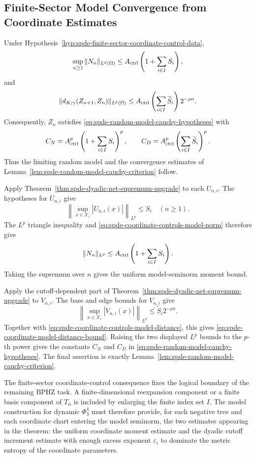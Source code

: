 \subsection{Finite-Sector Model Convergence from Coordinate Estimates}
\label{thm:spde-coordinate-estimates-model-convergence}
Under Hypothesis~\ref{hyp:spde-finite-sector-coordinate-control-data},
\[
  \sup_{n\geq1}
  \|N_n\|_{L^p(\Omega)}
  \leq
  A_{\rm ctrl}\left(1+\sum_{i\in I}S_i\right),
\]
and
\begin{equation}
  \|d_{K;\gamma}(Z_{n+1},Z_n)\|_{L^p(\Omega)}
  \leq
  A_{\rm ctrl}
  \left(\sum_{i\in I}\widetilde S_i\right)2^{-\rho n}.
  \label{eq:spde-coordinate-model-distance-bound}
\end{equation}
Consequently, \(Z_n\) satisfies
\eqref{eq:spde-random-model-cauchy-hypotheses} with
\[
  C_N=
  A_{\rm ctrl}^p\left(1+\sum_{i\in I}S_i\right)^p,
  \qquad
  C_D=
  A_{\rm ctrl}^p\left(\sum_{i\in I}\widetilde S_i\right)^p .
\]
Thus the limiting random model and the convergence estimates of
Lemma~\ref{lem:spde-random-model-cauchy-criterion} follow.

Apply Theorem~\ref{thm:spde-dyadic-net-supremum-upgrade} to each
\(U_{n,i}\).  The hypotheses for \(U_{n,i}\) give
\[
  \left\|
    \sup_{x\in\mathcal X_i}|U_{n,i}(x)|
  \right\|_{L^p}
  \leq S_i
  \quad(n\geq1).
\]
The \(L^p\) triangle inequality and
\eqref{eq:spde-coordinate-controls-model-norm} therefore give
\[
  \|N_n\|_{L^p}
  \leq
  A_{\rm ctrl}
  \left(1+\sum_{i\in I}S_i\right).
\]
Taking the supremum over \(n\) gives the uniform model-seminorm moment
bound.

Apply the cutoff-dependent part of
Theorem~\ref{thm:spde-dyadic-net-supremum-upgrade} to \(V_{n,i}\).  The
base and edge bounds for \(V_{n,i}\) give
\[
  \left\|
    \sup_{x\in\mathcal X_i}|V_{n,i}(x)|
  \right\|_{L^p}
  \leq
  \widetilde S_i2^{-\rho n}.
\]
Together with \eqref{eq:spde-coordinate-controls-model-distance}, this gives
\eqref{eq:spde-coordinate-model-distance-bound}.  Raising the two displayed
\(L^p\) bounds to the \(p\)-th power gives the constants \(C_N\) and \(C_D\)
in \eqref{eq:spde-random-model-cauchy-hypotheses}.  The final assertion is
exactly Lemma~\ref{lem:spde-random-model-cauchy-criterion}.

The finite-sector coordinate-control consequence fixes the
logical boundary of the remaining BPHZ task.  A finite-dimensional
reexpansion component or a finite basis component of \(T_\alpha\) is included
by enlarging the finite index set \(I\).  The model construction for
dynamic \(\Phi^4_3\) must therefore provide, for each negative tree and each
coordinate chart entering the model seminorm, the two estimates appearing in
the theorem: the uniform coordinate moment estimate and the dyadic cutoff
increment estimate with enough excess exponent \(\varepsilon_i\) to dominate
the metric entropy of the coordinate parameters.

